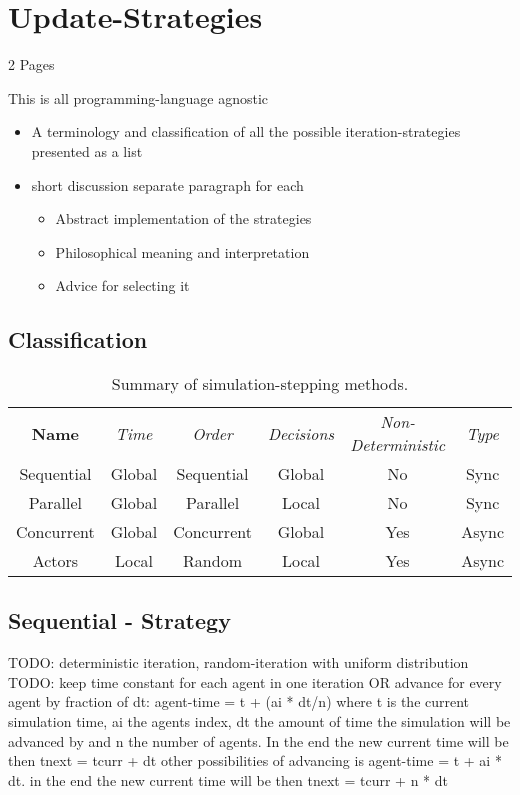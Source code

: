 \section{Update-Strategies}
2 Pages

This is all programming-language agnostic

\begin{itemize}
	\item A terminology and classification of all the possible iteration-strategies presented as a list 
	\item short discussion separate paragraph for each
		\begin{itemize}
			\item Abstract implementation of the strategies
			\item Philosophical meaning and interpretation
			\item Advice for selecting it
		\end{itemize}
\end{itemize} 


\subsection{Classification}

\begin{table}[H]
	\center
	\begin{tabular}{ c | c | c | c | c | c }
		\textbf{Name} & \textit{Time} & \textit{Order} & \textit{Decisions} & \textit{Non-Deterministic} & \textit{Type}\\
		\hhline{=|=|=|=|=|=}
	    Sequential & Global & Sequential & Global & No & Sync \\ 
	    \hline
	    Parallel & Global & Parallel & Local & No & Sync \\ 
	    \hline
	    Concurrent & Global & Concurrent & Global & Yes & Async \\ 
	    \hline
	    Actors & Local & Random & Local & Yes & Async \\ 
	\end{tabular}
	\caption{Summary of simulation-stepping methods.}
\end{table}

\subsection{Sequential - Strategy}
TODO: deterministic iteration, random-iteration with uniform distribution
TODO: keep time constant for each agent in one iteration OR 
		advance for every agent by fraction of dt: agent-time = t + (ai * dt/n) where t is the current simulation time, ai the agents index, dt the amount of time the simulation will be advanced by and n the number of agents. In the end the new current time will be then tnext = tcurr + dt
		other possibilities of advancing is agent-time = t + ai * dt. in the end the new current time will be then tnext = tcurr + n * dt
		

